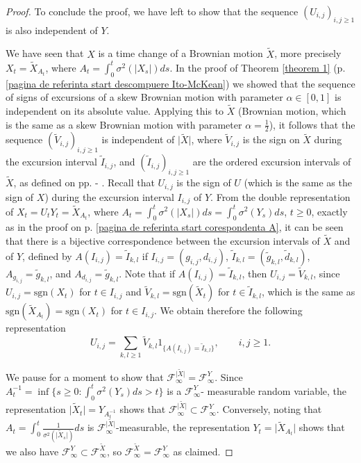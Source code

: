\documentclass[reqno]{amsart}
\theoremstyle{definition}
\theoremstyle{remark}
\numberwithin{equation}{section}
\begin{document}
\begin{proof}
To conclude the proof, we have left to show that the sequence $(U_{i,j})_{i,j \geq 1}$ is also independent of $Y$.

We have seen that $X$ is a time change of a Brownian motion $\widetilde{X}$, more precisely $X_t=\widetilde{X}_{A_t}$, where $A_t=\int_0^t \sigma^2(\vert X_s\vert) ds$. In the proof of Theorem \ref{theorem 1} (p. \ref{pagina de referinta start descompuere Ito-McKean}) we showed that the sequence of signs of excursions of a skew Brownian motion with parameter $\alpha\in [0,1]$ is independent on its absolute value. Applying this to $\widetilde{X}$ (Brownian motion, which is the same as a skew Brownian motion with parameter $\alpha=\frac12$), it follows that the sequence $(\widetilde{V}_{i,j})_{i,j\ge 1}$ is independent of $\vert \widetilde{X} \vert$, where $\widetilde{V}_{i,j}$ is the sign on $\widetilde{X}$ during the excursion interval $\widetilde{I}_{i,j}$, and $(\widetilde{I}_{i,j})_{i,j\ge 1}$ are the ordered excursion intervals of $\widetilde{X}$, as defined on pp. \pageref{sign choice} - \pageref{iid sign choice}. Recall that $U_{i,j}$ is the sign of $U$ (which is the same as the sign of $X$) during the excursion interval $I_{i,j}$ of $Y$. From the double representation of $X_t=U_t Y_t=\widetilde{X}_{A_t}$, where $A_t=\int_0^t \sigma^2(\vert X_s\vert) ds=\int_0^t \sigma^2(Y_s) ds$, $t\ge 0$, exactly as in the proof on p. \ref{pagina de referinta start corespondenta A}, it can be seen that there is a bijective correspondence  between the excursion intervals of $\widetilde{X}$ and of $Y$, defined by $A(I_{i,j})=\widetilde{I}_{k,l}$ if $I_{i,j}=(g_{i,j},d_{i,j})$, $\widetilde{I}_{k,l}=(\widetilde{g}_{k,l}, \widetilde{d}_{k,l})$, $A_{g_{i,j}}=\widetilde{g}_{k,l}$, and $A_{d_{i,j}}=\widetilde{g}_{k,l}$. Note that if $A(I_{i,j})=\widetilde{I}_{k,l}$, then $U_{i,j}=\widetilde{V}_{k,l}$, since $U_{i,j}=\mathrm{sgn}(X_t)$ for $t\in I_{i,j}$ and $\widetilde{V}_{k,l}=\mathrm{sgn}(\widetilde{X}_t)$ for $t\in \widetilde{I}_{k,l}$, which is the same as $\mathrm{sgn}(\widetilde{X}_{A_t})=\mathrm{sgn}(X_t)$ for $t \in I_{i,j}$. We obtain therefore the following representation
\begin{equation}\label{representation of U_i,j}
U_{i,j}=\sum_{k,l\ge 1}\widetilde{V}_{k,l}1_{\{A(I_{i,j})=\widetilde{I}_{k,l}\}}, \qquad i,j\ge 1.
\end{equation}

We pause for a moment to show that $\mathcal{F}^{\vert\widetilde{X}\vert}_\infty=\mathcal{F}^Y_\infty$. Since $A_t^{-1}=\inf\{s\ge0:\int_0^t \sigma^2(Y_s) ds>t\}$ is a $\mathcal{F}^Y_\infty$- measurable random variable, the representation $\vert\widetilde{X}_t\vert=Y_{A_t^{-1}}$ shows that $\mathcal{F}^{\vert\widetilde{X}\vert}_\infty\subset\mathcal{F}^Y_\infty$. Conversely, noting that $A_t=\int_0^t\frac{1}{\sigma^2(\vert\widetilde{X}_s\vert)} ds$ is $\mathcal{F}^{\vert\widetilde{X}\vert}_\infty$-measurable, the representation $Y_t=\vert\widetilde{X}_{A_t}\vert$ shows that we also have $\mathcal{F}^Y_\infty\subset\mathcal{F}^{\widetilde{X}}_\infty$, so $\mathcal{F}^{\widetilde{X}}_\infty=\mathcal{F}^Y_\infty$ as claimed.


\end{proof}
\end{document}
